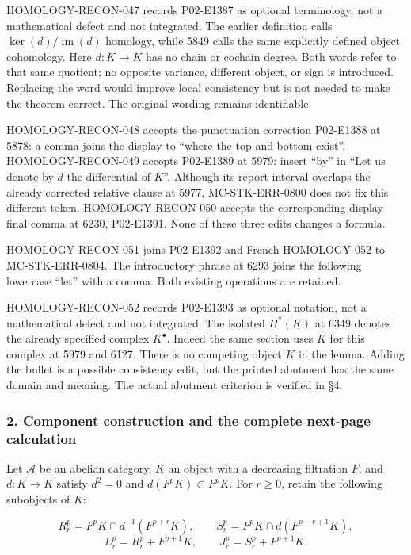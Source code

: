 HOMOLOGY-RECON-047 records P02-E1387 as optional terminology, not a mathematical defect and not integrated. The earlier definition calls \(\ker(d)/\operatorname{im}(d)\) homology, while 5849 calls the same explicitly defined object cohomology. Here \(d:K\to K\) has no chain or cochain degree. Both words refer to that same quotient; no opposite variance, different object, or sign is introduced. Replacing the word would improve local consistency but is not needed to make the theorem correct. The original wording remains identifiable.

HOMOLOGY-RECON-048 accepts the punctuation correction P02-E1388 at 5878: a comma joins the display to ``where the top and bottom exist''. HOMOLOGY-RECON-049 accepts P02-E1389 at 5979: insert ``by'' in ``Let us denote by \(d\) the differential of \(K\)''. Although its report interval overlaps the already corrected relative clause at 5977, MC-STK-ERR-0800 does not fix this different token. HOMOLOGY-RECON-050 accepts the corresponding display-final comma at 6230, P02-E1391. None of these three edits changes a formula.

HOMOLOGY-RECON-051 joins P02-E1392 and French HOMOLOGY-052 to MC-STK-ERR-0804. The introductory phrase at 6293 joins the following lowercase ``let'' with a comma. Both existing operations are retained.

HOMOLOGY-RECON-052 records P02-E1393 as optional notation, not a mathematical defect and not integrated. The isolated \(H^*(K)\) at 6349 denotes the already specified complex \(K^\bullet\). Indeed the same section uses \(K\) for this complex at 5979 and 6127. There is no competing object \(K\) in the lemma. Adding the bullet is a possible consistency edit, but the printed abutment has the same domain and meaning. The actual abutment criterion is verified in §4.

\subsubsection{2. Component construction and the complete next-page calculation}\label{component-construction-and-the-complete-next-page-calculation}

Let \(\mathcal A\) be an abelian category, \(K\) an object with a decreasing filtration \(F\), and \(d:K\to K\) satisfy \(d^2=0\) and \(d(F^pK)\subset F^pK\). For \(r\geq0\), retain the following subobjects of \(K\):

\[
R_r^p=F^pK\cap d^{-1}(F^{p+r}K),\qquad
S_r^p=F^pK\cap d(F^{p-r+1}K),
\] \[
L_r^p=R_r^p+F^{p+1}K,\qquad
J_r^p=S_r^p+F^{p+1}K.                 \tag{2.1}
\]


